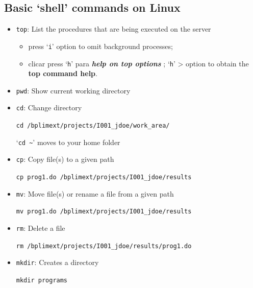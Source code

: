 \documentclass[
  11pt,
  a4paper,
]{article}
\begin{document}
\hypertarget{shell_commands}{%
\subsection{Basic `shell' commands on Linux}\label{shell_commands}}

\begin{itemize}
\item
  \texttt{top}: List the procedures that are being executed on the
  server

  \begin{itemize}
  \item
    press `\texttt{i}' option to omit background processes;
  \item
    clicar press `\texttt{h}' para \textbf{\emph{help on top options}} ;
    `\texttt{h}' \textgreater{} option to obtain the \textbf{top command
    help}.
  \end{itemize}
\item
  \texttt{pwd}: Show current working directory
\item
  \texttt{cd}: Change directory

  \texttt{cd\ /bplimext/projects/I001\_jdoe/work\_area/}

  `\texttt{cd\ \textasciitilde{}}' moves to your home folder
\end{itemize}

\begin{itemize}
\item
  \texttt{cp}: Copy file(s) to a given path

  \texttt{cp\ prog1.do\ /bplimext/projects/I001\_jdoe/results}
\end{itemize}

\begin{itemize}
\item
  \texttt{mv}: Move file(s) or rename a file from a given path

  \texttt{mv\ prog1.do\ /bplimext/projects/I001\_jdoe/results}
\end{itemize}

\begin{itemize}
\item
  \texttt{rm}: Delete a file

  \texttt{rm\ /bplimext/projects/I001\_jdoe/results/prog1.do}
\end{itemize}

\begin{itemize}
\item
  \texttt{mkdir}: Creates a directory

  \texttt{mkdir\ programs}
\end{itemize}
\end{document}
